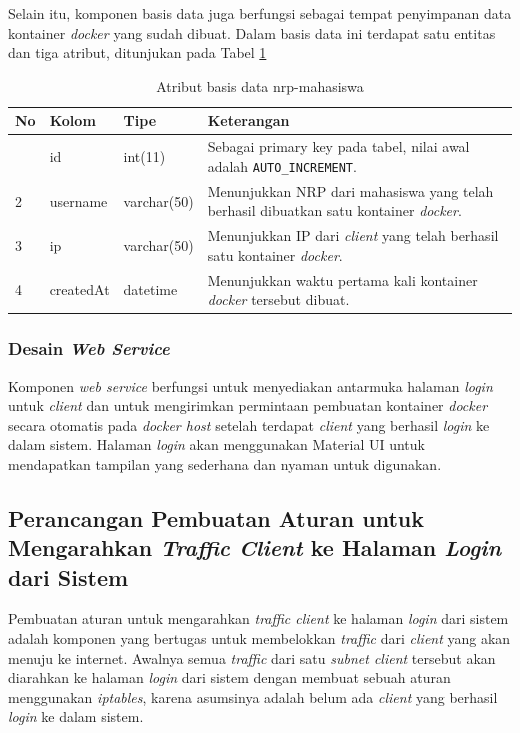    	Selain itu, komponen basis data juga berfungsi sebagai tempat penyimpanan data kontainer \textit{docker} yang sudah dibuat. Dalam basis data ini terdapat satu entitas dan tiga atribut, ditunjukan pada Tabel \ref{tabelkontainer}
   	\begin{longtable}{|p{}|p{}|p{}|p{}|}
   		\caption{Atribut basis data nrp-mahasiswa} \label{tabelkontainer} \\
   		\hline
   		\textbf{No} & \textbf{Kolom} & \textbf{Tipe} & \textbf{Keterangan} \\ \hline
   		\endhead
   		\endfoot
   		\endlastfoot
   		1 & id & int(11) & Sebagai primary key pada tabel, nilai awal adalah \texttt{AUTO\_INCREMENT}. \\ \hline
   		2 & username & varchar(50) & Menunjukkan NRP dari mahasiswa yang telah berhasil dibuatkan satu kontainer \textit{docker}. \\ \hline
   		3 & ip & varchar(50) & Menunjukkan IP dari \textit{client} yang telah berhasil satu kontainer \textit{docker}. \\ \hline
   		4 & createdAt & datetime & Menunjukkan waktu pertama kali kontainer \textit{docker} tersebut dibuat. \\ \hline
   		
   	\end{longtable}
	   
   	\subsubsection{Desain \textit{Web Service}}
	Komponen \textit{web service} berfungsi untuk menyediakan antarmuka halaman \textit{login} untuk \textit{client} dan untuk mengirimkan permintaan pembuatan kontainer \textit{docker} secara otomatis pada \textit{docker host} setelah terdapat \textit{client} yang berhasil \textit{login} ke dalam sistem. Halaman \textit{login} akan menggunakan Material UI untuk mendapatkan tampilan yang sederhana dan nyaman untuk digunakan.
	
	\subsection{Perancangan Pembuatan Aturan untuk Mengarahkan \textit{Traffic Client} ke Halaman \textit{Login} dari Sistem}
	Pembuatan aturan untuk mengarahkan \textit{traffic client} ke halaman \textit{login} dari sistem adalah komponen yang bertugas untuk membelokkan \textit{traffic} dari \textit{client} yang akan menuju ke internet. Awalnya semua \textit{traffic} dari satu \textit{subnet client} tersebut akan diarahkan ke halaman \textit{login} dari sistem dengan membuat sebuah aturan menggunakan \textit{iptables}, karena asumsinya adalah belum ada \textit{client} yang berhasil \textit{login} ke dalam sistem.
   	

